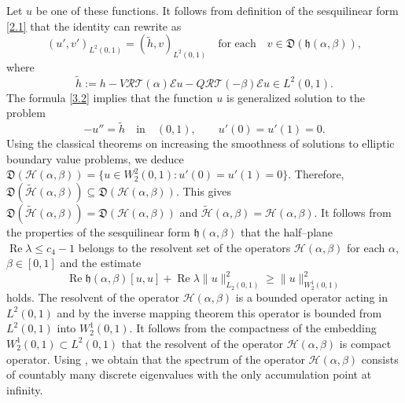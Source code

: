 \documentclass[10pt, a4paper]{article}
\theoremstyle{plain}
\theoremstyle{definition}
\numberwithin{equation}{section}
\def\l{\lambda}
\def\a{\alpha}
\def\b{\beta}
\def\hf{\mathfrak{h}}
\def\cE{\mathcal{E}}
\DeclareMathOperator{\RE}{Re}
\begin{document}
Let $u$ be one of these functions. It follows from definition of the
sesquilinear form \eqref{2.1} that the identity can rewrite as
\begin{equation}\label{3.2}
(u', v')_{L^2(0, 1)}=(\widetilde{h}, v)_{L^2(0, 1)}\quad\text{for each}
\quad v\in\mathfrak{D}(\mathfrak{h}(\alpha, \beta)),
\end{equation}
where
\[
\widetilde{h}:=h-V\mathcal{R}\mathcal{T}(\alpha)\cE u
-Q\mathcal{R}\mathcal{T}(-\beta)\cE u\in L^2(0, 1).
\]
The formula \eqref{3.2} implies that the function $u$ is generalized solution to the problem
\[
-u''=\widetilde{h} \quad \text{in} \quad (0, 1), \qquad u'(0)=u'(1)=0.
\]
Using the classical theorems on increasing the smoothness of solutions to elliptic
boundary value problems, we deduce $\mathfrak{D}(\mathcal{H}(\alpha, \beta))=
\{u\in W_2^2(0, 1): u'(0)=u'(1)=0\}$. Therefore,
$\mathfrak{D}(\widetilde{\mathcal{H}}(\alpha, \beta))\subseteq
\mathfrak{D}(\mathcal{H}(\alpha, \beta))$. This gives
$\mathfrak{D}(\widetilde{\mathcal{H}}(\alpha, \beta))=\mathfrak{D}(\mathcal{H}(\alpha, \beta))$ and
$\widetilde{\mathcal{H}}(\alpha, \beta)=\mathcal{H}(\alpha, \beta)$.
It follows from the properties of the
sesquilinear form $\mathfrak{h}(\alpha, \beta)$ that the half--plane $\RE \lambda\leqslant c_{4}-1$
belongs to the resolvent set of the operators $\mathcal{H}(\alpha, \beta)$ for each
$\alpha$, $\beta\in [0, 1]$ and the estimate
\begin{equation}\label{3.3}
\RE \hf(\a,\b)[u,u]+\RE\l \|u\|_{L_2(0,1)}^2\geqslant \|u\|_{W_2^1(0,1)}^2
\end{equation}
holds. The resolvent of the operator
$\mathcal{H}(\alpha, \beta)$ is a bounded operator acting in $L^2(0, 1)$ and by the
inverse mapping theorem this operator is bounded from $L^2(0, 1)$ into $W_2^1(0, 1)$. It follows from
the compactness of the embedding $W_2^1(0, 1)\subset L^2(0, 1)$ that the
resolvent of the operator $\mathcal{H}(\alpha, \beta)$ is compact operator.
Using \cite[Ch.~3, \S~6.8, Theorem~6.29]{Kato}, we obtain that
the spectrum of the operator $\mathcal{H}(\alpha, \beta)$ consists of countably
many discrete eigenvalues with the only accumulation point at infinity.
\end{document}
